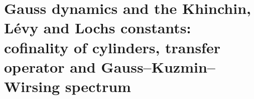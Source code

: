 \chapter{Gauss dynamics and the Khinchin, Lévy and Lochs constants: cofinality of cylinders, transfer operator and Gauss--Kuzmin--Wirsing spectrum}%
\begingroup
\renewcommand{\chapter}[2][]{}%
%
\endgroup

\begin{HMTScientificOwnerSubordinated}

\end{HMTScientificOwnerSubordinated}

\HMTFlushCurrentChapter
\chapter{Unimodal criticality of the dodecaphasic family: exact analytic profile, Feigenbaum approximants and hyperbolic renormalization certificate}%
\begingroup
\renewcommand{\chapter}[2][]{}%
%
\endgroup

\HMTFlushCurrentChapter
\chapter{Arithmetic of the dodecaphasic modular family of period \(30\): Rogers--Ramanujan identities, normalizer \(899\) and nonadic Pell lifting}%
\begingroup
\renewcommand{\chapter}[2][]{}%
%
\endgroup
\begin{HMTSpiralChapterBody}

\end{HMTSpiralChapterBody}

